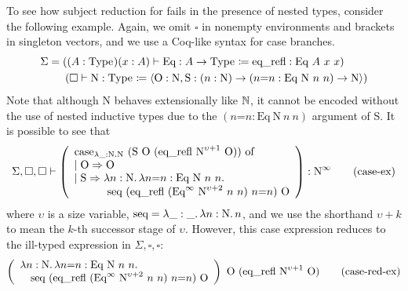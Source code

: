 To see how subject reduction for \lang fails in the presence of nested \coinductive types, consider the following example. Again, we omit $\square$ in nonempty environments and brackets in singleton vectors, and we use a Coq-like syntax for case branches.
%
\begin{alignat*}{1}
  \Sigma
    & = ((A : \text{Type}_{}) (x : A) \vdash \textrm{Eq} : A \to \text{Type}_{} \coloneqq \textrm{eq\_refl} : \textrm{Eq} ~ A ~ x ~ x) \\
    & \phantom{==} (\square \vdash \textrm{N} : \text{Type}_{} \coloneqq
        \langle \textrm{O} : \textrm{N},
        \textrm{S} : (n: \textrm{N}) \to (n\textrm{=}n : \textrm{Eq} ~ \textrm{N} ~ n ~ n) \to \textrm{N} \rangle)
\end{alignat*}
%
Note that although N behaves extensionally like $\mathbb{N}$, it cannot
be encoded without the use of nested inductive types due to the
$(n\textrm{=}n : \text{Eq} ~ \text{N} ~ n ~ n)$ argument of S.
%
It is possible to see that
%
\begin{displaymath}
  \Sigma, \square, \square \vdash
  \left(
  \begin{array}{l}
    \text{case}_{\lambda \_: \text{N}. \text{N}} ~ (\text{S} ~ \text{O} ~ (\text{eq\_refl} ~ \text{N}^{\upsilon+1} ~ \text{O})) ~
    \text{of} \\
    \mid \text{O} \Rightarrow \text{O} \\
    \mid \text{S} \Rightarrow \abs{n}{\text{N}}{\abs{n\text{=}n}{\text{Eq} ~ \text{N} ~ n ~ n}{}} \\
    \qquad\quad \text{seq} ~ (\text{eq\_refl} ~ (\text{Eq}^\infty ~ \text{N}^{\upsilon+2} ~ n ~ n) ~ n\text{=}n) ~ \text{O}
  \end{array}
  \right)
  : \text{N}^\infty
  \label{case-ex}\tag{case-ex}
\end{displaymath}
%
where $\upsilon$ is a size variable,
$\textrm{seq} = \lambda \_ : \_ \mathpunct{.} \lambda n : \text{N} \mathpunct{.} n$,
and we use the shorthand $\upsilon+k$ to mean the $k$-th successor stage of $\upsilon$.
%
However, this case expression reduces to the ill-typed expression in $\Sigma, \square, \square$:
%
\begin{displaymath}
  \left(
  \begin{array}{l}
    \abs{n}{\text{N}}{\abs{n\text{=}n}{\text{Eq} ~ \text{N} ~ n ~ n}{}} \\
    \quad \text{seq} ~ (\text{eq\_refl} ~ (\text{Eq}^\infty ~ \text{N}^{\upsilon+2} ~ n ~ n) ~ n\text{=}n) ~ \text{O}
  \end{array}
  \right)
  ~ \text{O} ~ (\text{eq\_refl} ~ \text{N}^{\upsilon+1} ~ \text{O})
  \label{case-red-ex}\tag{case-red-ex}
\end{displaymath}
%


